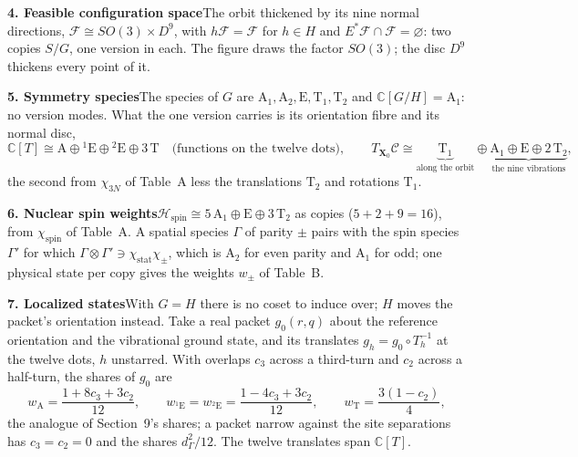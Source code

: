 \documentclass[12pt]{article}
\newcommand{\conf}{\mathcal{C}}
\newcommand{\spin}{\mathcal{H}_{\mathrm{spin}}}
\newcommand{\stat}{\chi_{\mathrm{stat}}}
\newcommand{\X}{\mathbf{X}}                 %
\begin{document}
{\noindent\textbf{4. Feasible configuration space}\quad The orbit thickened by its nine normal directions, $\mathcal
F\cong SO(3)\times D^9$, with $h\mathcal F=\mathcal F$ for $h\in H$ and $E^*\mathcal F\cap\mathcal F=\varnothing$:
two copies $S/G$, one version in each. The figure draws the factor $SO(3)$; the disc $D^9$ thickens every point of
it.

\newpage
\noindent\textbf{5. Symmetry species}\quad The species of $G$ are $\mathrm A_1,\mathrm A_2,\mathrm E,\mathrm
T_1,\mathrm T_2$ and $\mathbb C[G/H]=\mathrm A_1$: no version modes. What the one version carries is its orientation
fibre and its normal disc,
\[
\mathbb C[T]\cong\mathrm A\oplus{}^1\mathrm E\oplus{}^2\mathrm E\oplus3\,\mathrm T\quad\text{(functions on the
twelve dots)},
\qquad
T_{\X_0}\conf\cong\underbrace{\mathrm T_1}_{\text{along the orbit}}\oplus\underbrace{\mathrm A_1\oplus\mathrm
E\oplus2\,\mathrm T_2}_{\text{the nine vibrations}},
\]
the second from $\chi_{3N}$ of Table~A less the
translations $\mathrm T_2$ and rotations $\mathrm T_1$.

\noindent\textbf{6. Nuclear spin weights}\quad $\spin\cong5\,\mathrm A_1\oplus\mathrm E\oplus3\,\mathrm T_2$ as
copies ($5+2+9=16$), from $\chi_{\mathrm{spin}}$ of Table~A. A spatial species $\Gamma$ of parity $\pm$ pairs with
the spin species $\Gamma'$ for which $\Gamma\otimes\Gamma'\ni\stat\chi_\pm$, which is $\mathrm A_2$ for even parity
and $\mathrm A_1$ for odd; one physical state per copy gives the weights $w_\pm$ of Table~B.

\noindent\textbf{7. Localized states}\quad With $G=H$ there is no coset to induce over; $H$ moves the packet's
orientation instead. Take a real packet $g_0(r,q)$ about the reference orientation and the vibrational ground state,
and its translates $g_h=g_0\circ T_h^{-1}$ at the twelve dots, $h$ unstarred. With overlaps $c_3$ across a
third-turn and $c_2$ across a half-turn, the shares of $g_0$ are
\[
w_{\mathrm A}=\frac{1+8c_3+3c_2}{12},\qquad
w_{{}^1\mathrm E}=w_{{}^2\mathrm E}=\frac{1-4c_3+3c_2}{12},\qquad
w_{\mathrm T}=\frac{3(1-c_2)}{4},
\]
the analogue of Section~9's shares; a packet narrow against the site separations has $c_3=c_2=0$ and the shares
$d_\Gamma^2/12$. The twelve translates span $\mathbb C[T]$.

}
\end{document}
